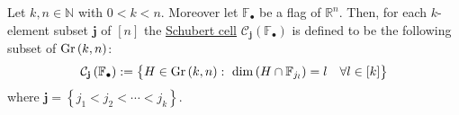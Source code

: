 \begin{definition} Let $k,n\in\mathbb{N}$ with $0<k<n$. Moreover let $\mathbb{F}_{\bullet}$ be a flag of $\mathbb{R}^n$. Then, for each $k$-element subset $\mathbf{j}$ of $[n]$ the \ul{Schubert cell} $\mathcal{C}_{\mathbf{j}}\left(\mathbb{F}_{\bullet}\right)$ is defined to be the following subset of $\Gr{k}{n}$:
$$\mathcal{C}_{\mathbf{j}}\left(\mathbb{F}_{\bullet}\right):=\big\{H\in\Gr{k}{n}:\ \dim\left(H\cap\mathbb{F}_{j_{l}}\right)=l\ \ \ \forall l\in[k]\big\}$$
where $\mathbf{j}=\left\{j_1<j_2<\cdots<j_k\right\}$.
\end{definition}









